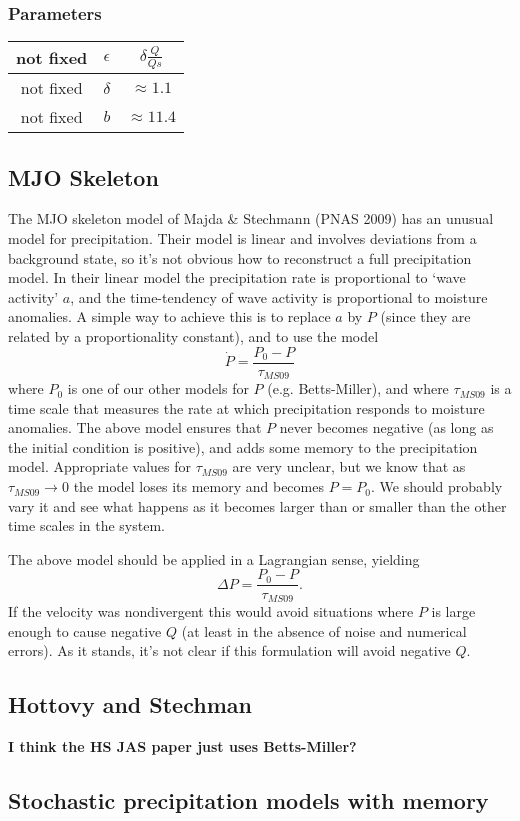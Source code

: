 \documentclass[10pt]{article}
\begin{document}
\subsubsection{Parameters}
\begin{center}
	\begin{tabular}{||c |c|c|| } 
		\hline
		not fixed & $\epsilon$ &   $\delta \frac{Q}{Qs}$ \\ \hline
		not fixed & $\delta$ & $ \approx 1.1$  \\ \hline
		not fixed & $b$& $ \approx 11.4$\\ \hline
	\end{tabular}
\end{center}

\subsection{MJO Skeleton}
The MJO skeleton model of Majda \& Stechmann (PNAS 2009) has an unusual model for precipitation.
Their model is linear and involves deviations from a background state, so it's not obvious how to reconstruct a full precipitation model.
In their linear model the precipitation rate is proportional to `wave activity' $a$, and the time-tendency of wave activity is proportional to moisture anomalies.
A simple way to achieve this is to replace $a$ by $P$ (since they are related by a proportionality constant), and to use the model
\[\dot{P} = \frac{P_0-P}{\tau_{MS09}}\]
where $P_0$ is one of our other models for $P$ (e.g. Betts-Miller), and
where $\tau_{MS09}$ is a time scale that measures the rate at which precipitation responds to moisture anomalies.
The above model ensures that $P$ never becomes negative (as long as the initial condition is positive), and adds some memory to the precipitation model.
Appropriate values for $\tau_{MS09}$ are very unclear, but we know that as $\tau_{MS09}\to0$ the model loses its memory and becomes $P=P_0$.
We should probably vary it and see what happens as it becomes larger than or smaller than the other time scales in the system.

The above model should be applied in a Lagrangian sense, yielding
\[\Delta P = \frac{P_0-P}{\tau_{MS09}}.\]
If the velocity was nondivergent this would avoid situations where $P$ is large enough to cause negative $Q$ (at least in the absence of noise and numerical errors).
As it stands, it's not clear if this formulation will avoid negative $Q$.

\subsection{Hottovy and Stechman}
{\bf I think the HS JAS paper just uses Betts-Miller?} 
 
\subsection{Stochastic precipitation models with memory}



\clearpage


\end{document}
